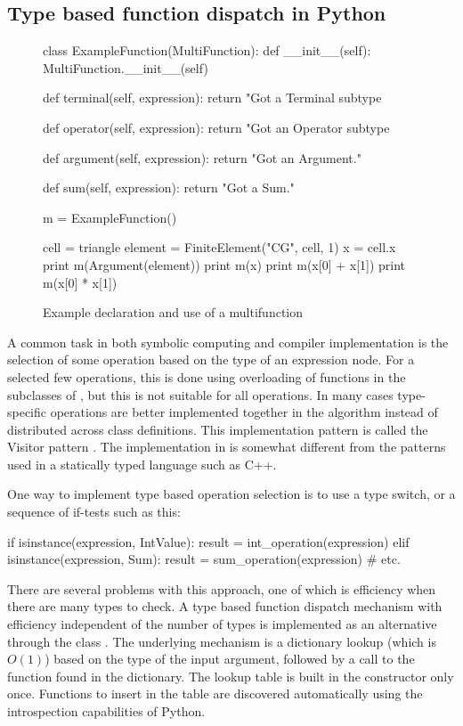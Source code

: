 \subsection{Type based function dispatch in Python} \label{ufl:sec:multifunction}
\begin{figure}[ht]
\begin{python}
class ExampleFunction(MultiFunction):
    def __init__(self):
        MultiFunction.__init__(self)

    def terminal(self, expression):
        return "Got a Terminal subtype %

    def operator(self, expression):
        return "Got an Operator subtype %

    def argument(self, expression):
        return "Got an Argument."

    def sum(self, expression):
        return "Got a Sum."

m = ExampleFunction()

cell = triangle
element = FiniteElement("CG", cell, 1)
x = cell.x
print m(Argument(element))
print m(x)
print m(x[0] + x[1])
print m(x[0] * x[1])
\end{python}
\caption{Example declaration and use of a multifunction}
\label{ufl:fig:examplefunction}
\end{figure}

A common task in both symbolic computing and compiler implementation
is the selection of some operation based on the type of an expression
node.  For a selected few operations, this is done using overloading
of functions in the subclasses of , but this is not
suitable for all operations.  In many cases type-specific operations
are better implemented together in the algorithm instead of
distributed across class definitions.  This implementation pattern
is called the Visitor pattern \citep{GammaHelmJohnsonEtAl1995}.
The implementation in \ufl{} is somewhat different from the
patterns used in a statically typed language such as C++.

One way to implement type based operation selection is to use a type
switch, or a sequence of if-tests such as this:
\begin{python}
if isinstance(expression, IntValue):
    result = int_operation(expression)
elif isinstance(expression, Sum):
    result = sum_operation(expression)
# etc.
\end{python}
There are several problems with this approach, one of which is
efficiency when there are many types to check.  A type based function
dispatch mechanism with efficiency independent of the number of types
is implemented as an alternative through the class
.  The underlying mechanism is a dictionary lookup
(which is $O(1)$) based on the type of the input argument, followed by
a call to the function found in the dictionary. The lookup table is
built in the  constructor only once.  Functions to
insert in the table are discovered automatically using the
introspection capabilities of Python.

